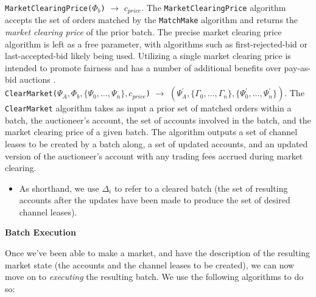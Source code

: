 \documentclass[10pt,a4paper]{article}
\theoremstyle{definition}
\begin{document}


\texttt{MarketClearingPrice($\Phi_b$)} $\rightarrow$ $c_{price}$. The
\texttt{MarketClearingPrice} algorithm accepts the set of orders matched by the
\texttt{MatchMake} algorithm and returns the \emph{market clearing price} of
the prior batch. The precise market clearing price algorithm is left as a free
parameter, with algorithms such as first-rejected-bid or last-accepted-bid
likely being used. Utilizing a single market clearing price is intended to
promote fairness and has a number of additional benefits over pay-as-bid
auctions \cite{payAsBid}. \\



\texttt{ClearMarket($\Psi_{A}, \Phi_b, \{\Psi_0, \dots, \Psi_n\}, c_{price}$)}
$\rightarrow$ $(\Psi_{A}^\prime, \{\Gamma_0, \dots, \Gamma_n\},
\{\Psi_{0}^\prime, \dots, \Psi_{n}^\prime\})$. The \texttt{ClearMarket}
algorithm takes as input a prior set of matched orders within a batch, the
auctioneer's account, the set of accounts involved in the batch, and the market
clearing price of a given batch. The algorithm outputs a set of channel leases
to be created by a batch along, a set of updated accounts, and an updated
version of the auctioneer's account with any trading fees accrued during market
clearing.


\begin{itemize}
    \item As shorthand, we use $\Delta_i$ to refer to a cleared batch (the set of
            resulting accounts after the updates have been made to produce the
            set of desired channel leases).
\end{itemize}


\begin{center}
    \textbf{Batch Execution}
\end{center}

Once we've been able to make a market, and have the description of the
resulting market state (the accounts and the channel leases to be created), we
can now move on to \emph{executing} the resulting batch. We use the following
algorithms to do so:  \\
\end{document}
